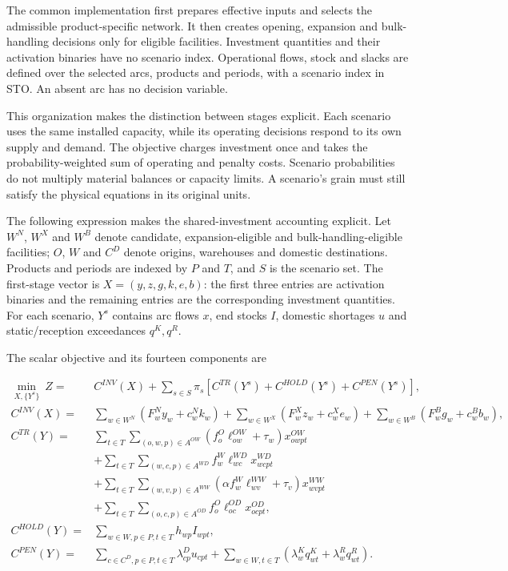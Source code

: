 \documentclass[
  english,
  11pt,
  a4paper,
]{article}
\begin{document}
The common implementation first prepares effective inputs and selects
the admissible product-specific network. It then creates opening,
expansion and bulk-handling decisions only for eligible facilities.
Investment quantities and their activation binaries have no scenario
index. Operational flows, stock and slacks are defined over the selected
arcs, products and periods, with a scenario index in STO. An absent arc
has no decision variable.

This organization makes the distinction between stages explicit. Each
scenario uses the same installed capacity, while its operating decisions
respond to its own supply and demand. The objective charges investment
once and takes the probability-weighted sum of operating and penalty
costs. Scenario probabilities do not multiply material balances or
capacity limits. A scenario's grain must still satisfy the physical
equations in its original units.

The following expression makes the shared-investment accounting
explicit. Let \(W^N\), \(W^X\) and \(W^B\) denote candidate,
expansion-eligible and bulk-handling-eligible facilities; \(O\), \(W\)
and \(C^D\) denote origins, warehouses and domestic destinations.
Products and periods are indexed by \(P\) and \(T\), and \(S\) is the
scenario set. The first-stage vector is \(X=(y,z,g,k,e,b)\): the first
three entries are activation binaries and the remaining entries are the
corresponding investment quantities. For each scenario, \(Y^s\) contains
arc flows \(x\), end stocks \(I\), domestic shortages \(u\) and
static/reception exceedances \(q^K,q^R\).

The scalar objective and its fourteen components are

\[
\begin{aligned}
\min_{X,\{Y^s\}}\ Z={}&C^{INV}(X)
+\sum_{s\in S}\pi_s
 \left[C^{TR}(Y^s)+C^{HOLD}(Y^s)+C^{PEN}(Y^s)\right],
\\
C^{INV}(X)={}&\sum_{w\in W^N}(F^N_wy_w+c^N_wk_w)
 +\sum_{w\in W^X}(F^X_wz_w+c^X_we_w)
 +\sum_{w\in W^B}(F^B_wg_w+c^B_wb_w),\\
C^{TR}(Y)={}&\sum_{t\in T}\sum_{(o,w,p)\in A^{OW}}
 (f^O_o\ell^{OW}_{ow}+\tau_w)x^{OW}_{owpt}\\
&+\sum_{t\in T}\sum_{(w,c,p)\in A^{WD}}f^W_w\ell^{WD}_{wc}x^{WD}_{wcpt}\\
&+\sum_{t\in T}\sum_{(w,v,p)\in A^{WW}}
 (\alpha f^W_w\ell^{WW}_{wv}+\tau_v)x^{WW}_{wvpt}\\
&+\sum_{t\in T}\sum_{(o,c,p)\in A^{OD}}f^O_o\ell^{OD}_{oc}x^{OD}_{ocpt},\\
C^{HOLD}(Y)={}&\sum_{w\in W,p\in P,t\in T}h_{wp}I_{wpt},\\
C^{PEN}(Y)={}&\sum_{c\in C^D,p\in P,t\in T}\lambda^D_{cp}u_{cpt}
 +\sum_{w\in W,t\in T}(\lambda^K_wq^K_{wt}+\lambda^R_wq^R_{wt}).
\end{aligned}
\tag{C.1}
\]
\end{document}
